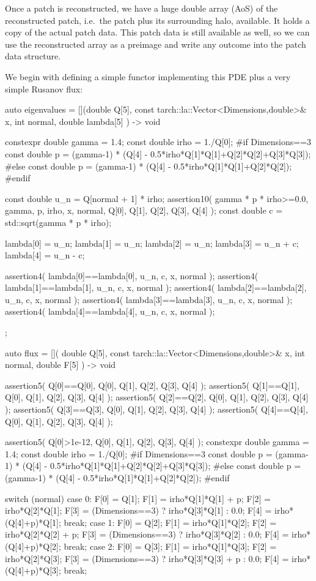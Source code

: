Once a patch is reconstructed, we have a huge double array (AoS) of the
reconstructed patch, i.e.~the patch plus its surrounding halo, available.
It holds a copy of the actual patch data.
This patch data is still available as well, so we can use the reconstructed
array as a preimage and write any outcome into the patch data structure.


We begin with defining a simple functor implementing this PDE plus a very simple
Rusanov flux:
\begin{code}
auto eigenvalues = [](double Q[5], const tarch::la::Vector<Dimensions,double>& x, 
  int normal, double lambda[5]
) -> void {
  constexpr double gamma = 1.4;
  const double irho = 1./Q[0];
  #if Dimensions==3
    const double p = (gamma-1) * (Q[4] - 0.5*irho*Q[1]*Q[1]+Q[2]*Q[2]+Q[3]*Q[3]);
  #else
    const double p = (gamma-1) * (Q[4] - 0.5*irho*Q[1]*Q[1]+Q[2]*Q[2]);
  #endif

  const double u_n = Q[normal + 1] * irho;
  assertion10( gamma * p * irho>=0.0, gamma, p, irho, x, normal, Q[0], Q[1], Q[2], Q[3], Q[4] );
  const double c   = std::sqrt(gamma * p * irho);

  lambda[0]  = u_n;
  lambda[1]  = u_n;
  lambda[2]  = u_n;
  lambda[3]  = u_n + c;
  lambda[4]  = u_n - c;
    
  assertion4( lambda[0]==lambda[0], u_n, c, x, normal );
  assertion4( lambda[1]==lambda[1], u_n, c, x, normal );
  assertion4( lambda[2]==lambda[2], u_n, c, x, normal );
  assertion4( lambda[3]==lambda[3], u_n, c, x, normal );
  assertion4( lambda[4]==lambda[4], u_n, c, x, normal );
};
  
auto flux = [](
  double Q[5], const tarch::la::Vector<Dimensions,double>& x, int normal, double F[5]
) -> void {
  assertion5( Q[0]==Q[0], Q[0], Q[1], Q[2], Q[3], Q[4] );    
  assertion5( Q[1]==Q[1], Q[0], Q[1], Q[2], Q[3], Q[4] );    
  assertion5( Q[2]==Q[2], Q[0], Q[1], Q[2], Q[3], Q[4] );    
  assertion5( Q[3]==Q[3], Q[0], Q[1], Q[2], Q[3], Q[4] );    
  assertion5( Q[4]==Q[4], Q[0], Q[1], Q[2], Q[3], Q[4] );    
    
  assertion5( Q[0]>1e-12, Q[0], Q[1], Q[2], Q[3], Q[4] );
  constexpr double gamma = 1.4;
  const double irho = 1./Q[0];
  #if Dimensions==3
    const double p = (gamma-1) * (Q[4] - 0.5*irho*Q[1]*Q[1]+Q[2]*Q[2]+Q[3]*Q[3]);
  #else
    const double p = (gamma-1) * (Q[4] - 0.5*irho*Q[1]*Q[1]+Q[2]*Q[2]);
  #endif

  switch (normal) {
    case 0:
      {
        F[0] = Q[1];
        F[1] = irho*Q[1]*Q[1] + p;
        F[2] = irho*Q[2]*Q[1];
        F[3] = (Dimensions==3) ? irho*Q[3]*Q[1] : 0.0;
        F[4] = irho*(Q[4]+p)*Q[1];
      }
      break;
    case 1:
      {
        F[0] = Q[2];
        F[1] = irho*Q[1]*Q[2];
        F[2] = irho*Q[2]*Q[2] + p;
        F[3] = (Dimensions==3) ? irho*Q[3]*Q[2] : 0.0;
        F[4] = irho*(Q[4]+p)*Q[2];
      }
      break;
    case 2:
      {
        F[0] = Q[3];
        F[1] = irho*Q[1]*Q[3];
        F[2] = irho*Q[2]*Q[3];
        F[3] = (Dimensions==3) ? irho*Q[3]*Q[3] + p : 0.0;
        F[4] = irho*(Q[4]+p)*Q[3];
      }
      break;
  }

}
\end{code}
